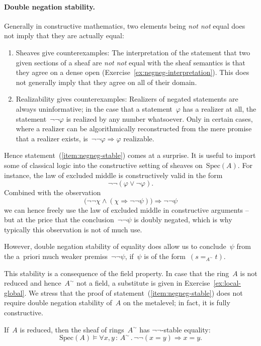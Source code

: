 \documentclass{ws-rv9x6}
\newcommand{\Spec}{\mathrm{Spec}}
\renewcommand{\_}{\mathpunct{.}}
\newcommand{\?}{\,{:}\,}
\newcommand{\notnot}{\emph{not not}\xspace}
\begin{document}
\paragraph{Double negation stability.}\label{par:double-negation-stability}
Generally in constructive mathematics,
two elements being \notnot equal does not imply that they are actually equal:
\begin{enumerate}
\item Sheaves give counterexamples: The interpretation of the statement that
two given sections of a sheaf are \notnot equal with the sheaf semantics is
that they agree on a dense open (Exercise~\ref{ex:negneg-interpretation}). This
does not generally imply that they agree on all of their domain.
\item Realizability gives counterexamples: Realizers of negated statements are
always uninformative; in the case that a statement~$\varphi$ has a realizer at
all, the statement~$\neg\neg\varphi$ is realized by any number whatsoever.
Only in certain cases, where a realizer can be algorithmically reconstructed
from the mere promise that a realizer exists, is~$\neg\neg\varphi \Rightarrow
\varphi$ realizable.
\end{enumerate}

Hence statement~(\ref{item:negneg-stable}) comes at a surprise. It is useful to
import some of classical logic into the constructive setting of sheaves
on~$\Spec(A)$. For instance, the law of excluded middle is constructively valid
in the form
\[ \neg\neg(\varphi \vee \neg\varphi). \]
Combined with the observation
\[ \bigl(\neg\neg\chi \wedge (\chi \Rightarrow \neg\neg\psi)\bigr) \Longrightarrow \neg\neg\psi \]
we can hence freely use the law of excluded middle in constructive arguments --
but at the price that the conclusion~$\neg\neg\psi$ is doubly negated, which is
why typically this observation is not of much use.

However, double negation stability of equality does allow us to conclude~$\psi$
from the a~priori much weaker premiss~$\neg\neg\psi$, if~$\psi$ is of the
form~$(s =_{A^\sim} t)$.

This stability is a consequence of the field property. In case that the
ring~$A$ is not reduced and hence~$A^\sim$ not a field, a substitute is given
in Exercise~\ref{ex:local-global}. We stress that the proof of
statement~(\ref{item:negneg-stable}) does not require double negation stability
of~$A$ on the metalevel; in fact, it is fully constructive.

\begin{proposition}If~$A$ is reduced, then the sheaf of rings~$A^\sim$ has $\neg\neg$-stable equality:
\[ \Spec(A) \models \forall x,y\?A^\sim\_ \neg\neg(x = y) \Rightarrow x = y. \]
\end{proposition}
\end{document}
